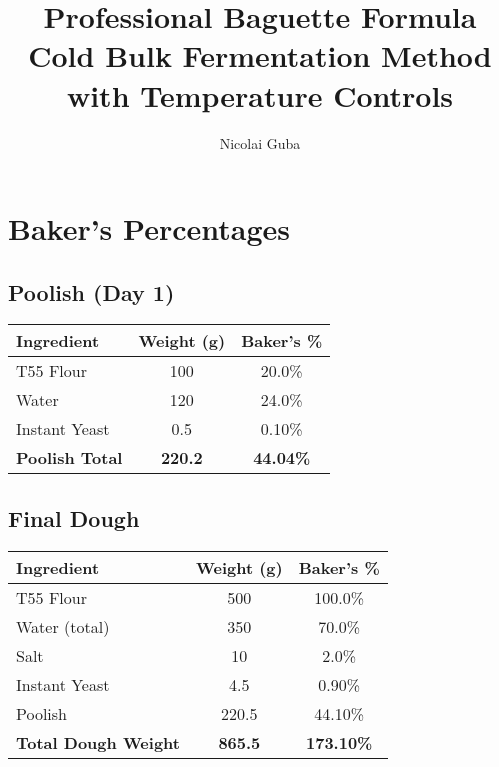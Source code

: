 \documentclass[10pt,a4paper]{article}
\begin{document}
    \title{\textcolor{headerblue}{\textbf{Professional Baguette Formula}}\\
    \large\textcolor{headerblue}{Cold Bulk Fermentation Method with Temperature Controls}}
    \author{Nicolai Guba}
    \date{}
    \maketitle
    \tableofcontents
    \newpage


    \section{Baker's Percentages}

    \subsection{Poolish (Day 1)}
    \begin{table}[h]
        \begin{tabular}{@{}lcc@{}}
            \toprule
            \textbf{Ingredient}    & \textbf{Weight (g)} & \textbf{Baker's \%} \\
            \midrule
            T55 Flour              & 100                 & 20.0\%              \\
            Water                  & 120                 & 24.0\%              \\
            Instant Yeast          & 0.5                 & 0.10\%              \\
            \midrule
            \textbf{Poolish Total} & \textbf{220.2}      & \textbf{44.04\%}    \\
            \bottomrule
        \end{tabular}
    \end{table}

    \subsection{Final Dough}
    \begin{table}[h]
        \begin{tabular}{@{}lcc@{}}
            \toprule
            \textbf{Ingredient}         & \textbf{Weight (g)} & \textbf{Baker's \%} \\
            \midrule
            T55 Flour                   & 500                 & 100.0\%             \\
            Water (total)               & 350                 & 70.0\%              \\
            Salt                        & 10                  & 2.0\%               \\
            Instant Yeast               & 4.5                 & 0.90\%              \\
            Poolish                     & 220.5               & 44.10\%             \\
            \midrule
            \textbf{Total Dough Weight} & \textbf{865.5}      & \textbf{173.10\%}   \\
            \bottomrule
        \end{tabular}
    \end{table}
\end{document}
